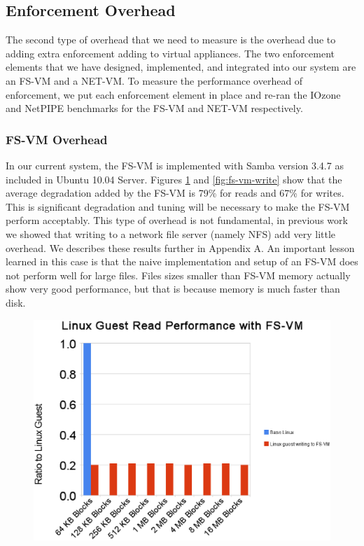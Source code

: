 \subsection{Enforcement Overhead}
\label{sec:enforce-overhead}

The second type of overhead that we need to measure is the overhead due to adding extra enforcement adding to virtual appliances. The two enforcement elements that we have designed, implemented, and integrated into our system are an FS-VM and a NET-VM. To measure the performance overhead of enforcement, we put each enforcement element in place and re-ran the IOzone and NetPIPE benchmarks for the FS-VM and NET-VM respectively.

\subsubsection{FS-VM Overhead}

In our current system, the FS-VM is implemented with Samba version 3.4.7 as included in Ubuntu 10.04 Server. Figures  \ref{fig:fs-vm-read} and  \ref{fig:fs-vm-write} show that the average degradation added by the FS-VM is 79\% for reads and 67\% for writes. This is significant degradation and tuning will be necessary to make the FS-VM perform acceptably. This type of overhead is not fundamental, in previous work we showed that writing to a network file server (namely NFS) add very little overhead. We describes these results further in Appendix A. An important lesson learned in this case is that the naive implementation and setup of an FS-VM does not perform well for large files. Files sizes smaller than FS-VM memory actually show very good performance, but that is because memory is much faster than disk. 

\begin{figure}[tbp]
\begin{centering}
\label{fig:fs-vm-read}
\includegraphics[scale=.7,angle=90]{figs/fs-vm-read}
\end{centering}
\end{figure}

